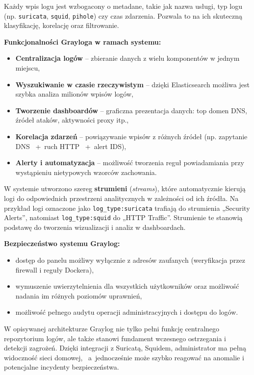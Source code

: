 \documentclass[
    left=2.5cm,         %
    right=2.5cm,        %
    top=2.5cm,          %
    bottom=3cm,         %
    bindingoffset=6mm,  %
    nohyphenation=true %
]{eiti/eiti-thesis} %
\begin{document}
Każdy wpis logu jest wzbogacony o metadane, takie jak nazwa usługi, typ logu (np. \texttt{suricata}, \texttt{squid}, \texttt{pihole}) czy czas zdarzenia. Pozwala 
to na ich skuteczną klasyfikację, korelację oraz filtrowanie.

\textbf{Funkcjonalności Grayloga w ramach systemu:}
\begin{itemize}
    \item \textbf{Centralizacja logów} – zbieranie danych z wielu komponentów w jednym miejscu,
    \item \textbf{Wyszukiwanie w czasie rzeczywistym} – dzięki Elasticsearch możliwa jest szybka analiza milionów wpisów logów,
    \item \textbf{Tworzenie dashboardów} – graficzna prezentacja danych: top domen DNS, źródeł ataków, aktywności proxy itp.,
    \item \textbf{Korelacja zdarzeń} – powiązywanie wpisów z różnych źródeł (np. zapytanie DNS ~+~ruch HTTP ~+~alert IDS),
    \item \textbf{Alerty i automatyzacja} – możliwość tworzenia reguł powiadamiania przy wystąpieniu nietypowych wzorców zachowania.
\end{itemize}

W systemie utworzono szereg \textbf{strumieni} (\textit{streams}), które automatycznie kierują logi do odpowiednich przestrzeni analitycznych w zależności od ich źródła. Na przykład logi oznaczone jako \texttt{log\_type:suricata} trafiają do strumienia „Security Alerts”, natomiast \texttt{log\_type:squid} do „HTTP Traffic”. Strumienie te stanowią podstawę do tworzenia wizualizacji i analiz w dashboardach.

\textbf{Bezpieczeństwo systemu Graylog:}
\begin{itemize}
    \item dostęp do panelu możliwy wyłącznie z adresów zaufanych (weryfikacja przez firewall i reguły Dockera),
    \item wymuszenie uwierzytelnienia dla wszystkich użytkowników oraz możliwość nadania im różnych poziomów uprawnień,
    \item możliwość pełnego audytu operacji administracyjnych i dostępu do logów.
\end{itemize}

W opisywanej architekturze Graylog nie tylko pełni funkcję centralnego repozytorium logów, ale także stanowi fundament wczesnego ostrzegania i detekcji zagrożeń. Dzięki integracji z Suricatą, Squidem, administrator ma pełną widoczność sieci domowej, ~a~jednocześnie może szybko reagować na anomalie i potencjalne incydenty bezpieczeństwa.
\end{document}
